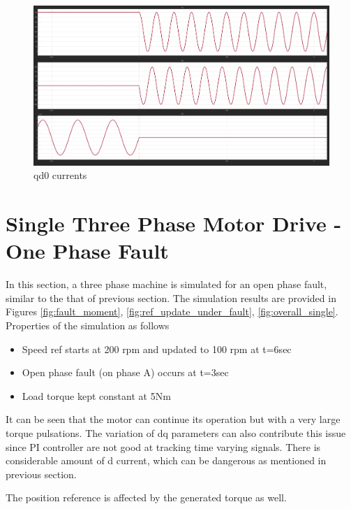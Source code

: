 \documentclass{article}
\begin{document}
\begin{figure}[h!]
\centering
\includegraphics[scale=0.3]{Figures/ResistiveLoad/Iqd0.png}
\caption{qd0 currents}
\label{fig:ResistiveLoad_Iqd0}
\end{figure}


\section{Single Three Phase Motor Drive - One Phase Fault}
In this section, a three phase machine is simulated for an open phase fault, similar to the that of previous section. The simulation results are provided in Figures \ref{fig:fault_moment}, \ref{fig:ref_update_under_fault}, \ref{fig:overall_single}. Properties of the simulation as follows
\begin{itemize}
    \item Speed ref starts at 200 rpm and updated to 100 rpm at t=6sec
    \item Open phase fault (on phase A) occurs at t=3sec
    \item Load torque kept constant at 5Nm
\end{itemize}

It can be seen that the motor can continue its operation but with a very large torque pulsations. The variation of dq parameters can also contribute this issue since PI controller are not good at tracking time varying signals. There is considerable amount of d current, which can be dangerous as mentioned in previous section. 

The position reference is affected by the generated torque as well.
\end{document}
